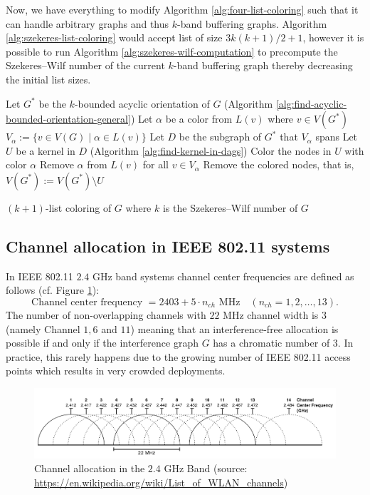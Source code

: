 \documentclass[a4paper, 12pt]{article}
\begin{document}
Now, we have everything to modify Algorithm \ref{alg:four-list-coloring} such that it can handle arbitrary graphs and thus $k$-band buffering graphs. Algorithm \ref{alg:szekeres-list-coloring} would accept list of size $3k(k+1)/2+1$, however it is possible to run Algorithm \ref{alg:szekeres-wilf-computation} to precompute the Szekeres\---Wilf number of the current $k$-band buffering graph thereby decreasing the initial list sizes.

\begin{algorithm}[h!]\label{alg:szekeres-list-coloring}
  Let $G^*$ be the $k$-bounded acyclic orientation of $G$  (Algorithm \ref{alg:find-acyclic-bounded-orientation-general})\;
   {
  	Let $\alpha$ be a color from $L(v)$ where $v \in V(G^*)$\;
  	$V_\alpha := \lbrace v \in V(G) \mid \alpha \in L(v) \rbrace$\;
  	Let $D$ be the subgraph of $G^*$ that $V_\alpha$ spans\;
  	Let $U$ be a kernel in $D$ (Algorithm \ref{alg:find-kernel-in-dags})\;
  	Color the nodes in $U$ with color $\alpha$\;
  	Remove $\alpha$ from $L(v)$ for all $v \in V_\alpha$\;
  	Remove the colored nodes, that is, $V(G^*) := V(G^*) \setminus U$\;
  }
 \caption{$(k+1)$-list coloring of $G$ where $k$ is the Szekeres\---Wilf number of $G$}
\end{algorithm}

\subsection{Channel allocation in IEEE 802.11 systems}
In IEEE 802.11 $2.4$ GHz band systems channel center frequencies are defined as follows \cite{ieee80211} (cf. Figure \ref{fig:channel-allocation}):
$$\text{Channel center frequency } = 2403 + 5\cdot n_{ch} \text{ MHz} \quad (n_{ch} = 1,2,\ldots, 13).$$
The number of non-overlapping channels with $22$ MHz channel width is $3$ (namely Channel $1, 6$ and $11$) meaning that an interference-free allocation is possible if and only if the interference graph $G$ has a chromatic number of $3$. In practice, this rarely happens due to the growing number of IEEE 802.11 access points which results in very crowded deployments.
\begin{figure}[!h]
\centering
\includegraphics[scale=0.3]{figures/wifi-freq.png}
\caption{Channel allocation in the $2.4$ GHz Band (source: \url{https://en.wikipedia.org/wiki/List_of_WLAN_channels})}\label{fig:channel-allocation}
\end{figure}
\end{document}
